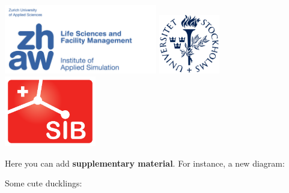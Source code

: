 \documentclass[a0paper,fleqn]{betterposter}
\begin{document}
{%
\vfill

\includegraphics[width=0.5\textwidth]{img/zhaw_lsfm_ias_blau_en.jpg}
\includegraphics[width=0.2\textwidth]{img/logo_SU.png}
\includegraphics[width=0.3\textwidth]{img/logo_sib.png}
}{

Here you can add \textbf{supplementary material}. For instance, a new diagram:
\begin{center}
\end{center}

Some cute ducklings:
\begin{center}
\end{center}
}
\end{document}
